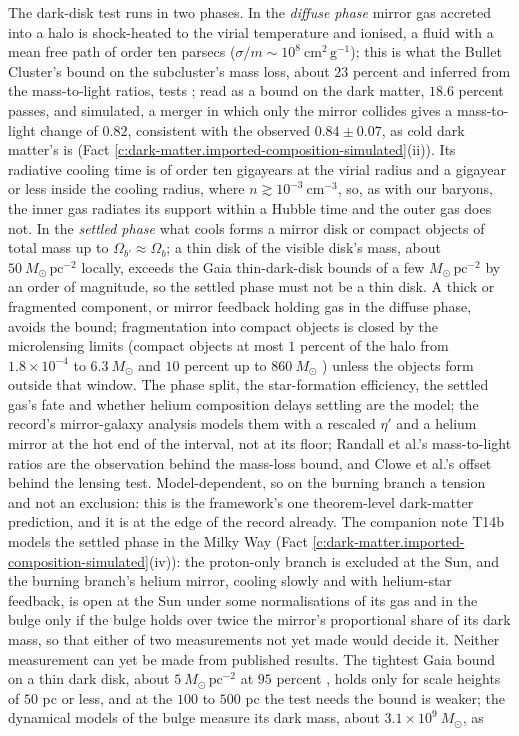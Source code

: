 \documentclass[11pt]{article}
\theoremstyle{definition}
\theoremstyle{plain}
\begin{document}
\begin{enumerate}
The dark-disk test runs in two phases. In the \emph{diffuse phase} mirror gas accreted into a halo is shock-heated to the virial temperature and ionised, a fluid with a mean free path of order ten parsecs ($\sigma/m \sim 10^{8}\ \mathrm{cm^{2}\,g^{-1}}$); this is what the Bullet Cluster's bound on the subcluster's mass loss, about $23$ percent and inferred from the mass-to-light ratios, tests \cite{Randall2008}; read as a bound on the dark matter, $18.6$ percent passes, and simulated, a merger in which only the mirror collides gives a mass-to-light change of $0.82$, consistent with the observed $0.84 \pm 0.07$, as cold dark matter's is (Fact \ref{c:dark-matter.imported-composition-simulated}(ii)). Its radiative cooling time is of order ten gigayears at the virial radius and a gigayear or less inside the cooling radius, where $n \gtrsim 10^{-3}\ \mathrm{cm^{-3}}$, so, as with our baryons, the inner gas radiates its support within a Hubble time and the outer gas does not. In the \emph{settled phase} what cools forms a mirror disk or compact objects of total mass up to $\Omega_{b'} \approx \Omega_{b}$; a thin disk of the visible disk's mass, about $50\ M_{\odot}\,\mathrm{pc^{-2}}$ locally, exceeds the Gaia thin-dark-disk bounds of a few $M_{\odot}\,\mathrm{pc^{-2}}$ \cite{Schutz2018, Widmark2021} by an order of magnitude, so the settled phase must not be a thin disk. A thick or fragmented component, or mirror feedback holding gas in the diffuse phase, avoids the bound; fragmentation into compact objects is closed by the microlensing limits (compact objects at most $1$ percent of the halo from $1.8 \times 10^{-4}$ to $6.3\ M_{\odot}$ and $10$ percent up to $860\ M_{\odot}$ \cite{Mroz2024}) unless the objects form outside that window. The phase split, the star-formation efficiency, the settled gas's fate and whether helium composition delays settling are the model; the record's mirror-galaxy analysis \cite{RouxCline2020} models them with a rescaled $\eta'$ and a helium mirror at the hot end of the interval, not at its floor; Randall et al.'s mass-to-light ratios \cite{Randall2008} are the observation behind the mass-loss bound, and Clowe et al.'s offset \cite{Clowe2006} behind the lensing test. Model-dependent, so on the burning branch a tension and not an exclusion: this is the framework's one theorem-level dark-matter prediction, and it is at the edge of the record already. The companion note T14b models the settled phase in the Milky Way (Fact \ref{c:dark-matter.imported-composition-simulated}(iv)): the proton-only branch is excluded at the Sun, and the burning branch's helium mirror, cooling slowly and with helium-star feedback, is open at the Sun under some normalisations of its gas and in the bulge only if the bulge holds over twice the mirror's proportional share of its dark mass, so that either of two measurements not yet made would decide it. Neither measurement can yet be made from published results. The tightest Gaia bound on a thin dark disk, about $5\ M_{\odot}\,\mathrm{pc^{-2}}$ at $95$ percent \cite{Widmark2021}, holds only for scale heights of $50$ pc or less, and at the $100$ to $500$ pc the test needs the bound is weaker; the dynamical models of the bulge \cite{Portail2017} measure its dark mass, about $3.1 \times 10^{9}\ M_{\odot}$, as 
\end{enumerate}
\end{document}
